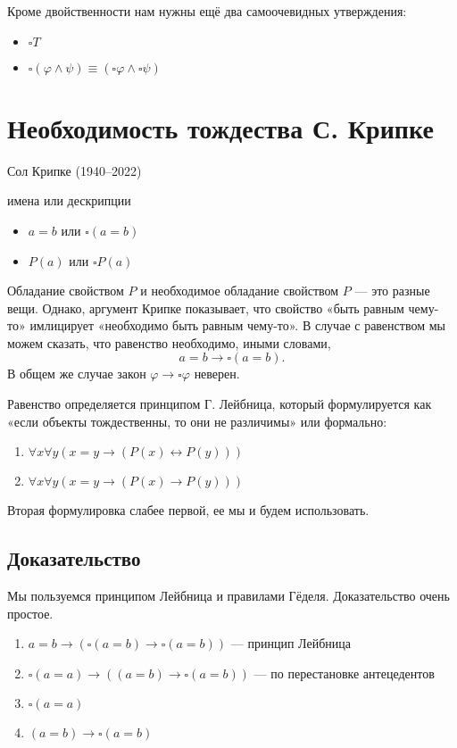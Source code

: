\documentclass[openany]{book}
\theoremstyle{plain}
\theoremstyle{definition}
\begin{document}
Кроме двойственности нам нужны ещё два самоочевидных утверждения:
\begin{itemize}
\item \(\square T\)
\item \(\square (\varphi \land \psi) \equiv (\square \varphi \land \square \psi)\)
\end{itemize}

\section{Необходимость тождества С. Крипке}

Сол Крипке (1940–2022)

имена или дескрипции
\begin{itemize}
\item \(a = b\) или \(\square(a = b)\)
\item \(P(a)\) или \(\square P(a)\)
\end{itemize}

Обладание свойством \(P\) и необходимое обладание свойством \(P\) — это разные вещи. Однако, аргумент Крипке показывает, что свойство «быть равным чему-то» имлицирует «необходимо быть равным чему-то». В случае с равенством мы можем сказать, что равенство необходимо, иными словами, $$a = b \to \square(a = b).$$ В общем же случае закон \(\varphi \to \square \varphi\) неверен.

Равенство определяется принципом Г. Лейбница, который формулируется как «если объекты тождественны, то они не различимы» или формально:
\begin{enumerate}
    \item \(\forall x \forall y (x = y \to (P(x) \leftrightarrow P(y)))\)
    \item \(\forall x \forall y (x = y \to (P(x) \to P(y)))\)
\end{enumerate}

Вторая формулировка слабее первой, ее мы и будем использовать.

\subsection{ Доказательство }
Мы пользуемся принципом Лейбница и правилами Гёделя. Доказательство очень простое.

\begin{enumerate}
\item \(a = b \to (\square(a = b) \to \square(a = b))\) — принцип Лейбница
\item \(\square(a = a) \to ((a = b) \to \square(a = b))\) — по перестановке антецедентов
\item \(\square(a = a)\)
\item \((a = b) \to \square(a = b)\)
\end{enumerate}
\end{document}
